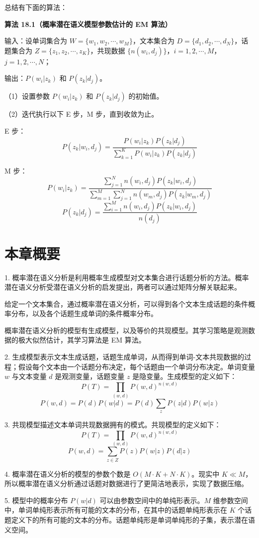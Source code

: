 \documentclass[UTF8, 12pt, fontset=fandol, oneside]{ctexart}
\begin{document}
总结有下面的算法：

\noindent\textbf{算法 18.1（概率潜在语义模型参数估计的 EM 算法）}

\noindent 输入：设单词集合为 $W=\{w_1,w_2,\cdots,w_M\}$，文本集合为 $D=\{d_1,d_2,\cdots,d_N\}$，话题集合为 $Z=\{z_1,z_2,\cdots,z_K\}$，共现数据 $\{n(w_i,d_j)\}$，$i=1,2,\cdots,M$，$j=1,2,\cdots,N$；

\noindent 输出：$P(w_i|z_k)$ 和 $P(z_k|d_j)$。

（1）设置参数 $P(w_i|z_k)$ 和 $P(z_k|d_j)$ 的初始值。

（2）迭代执行以下 E 步，M 步，直到收敛为止。

\noindent E 步：
\[
P(z_k|w_i,d_j)=
\frac{P(w_i|z_k)P(z_k|d_j)}
{\displaystyle\sum_{k=1}^{K}P(w_i|z_k)P(z_k|d_j)}
\]

\noindent M 步：
\[
P(w_i|z_k)=
\frac{\displaystyle\sum_{j=1}^{N}n(w_i,d_j)P(z_k|w_i,d_j)}
{\displaystyle\sum_{m=1}^{M}\sum_{j=1}^{N}n(w_m,d_j)P(z_k|w_m,d_j)}
\]
\[
P(z_k|d_j)=
\frac{\displaystyle\sum_{i=1}^{M}n(w_i,d_j)P(z_k|w_i,d_j)}
{n(d_j)}
\]

\section*{本章概要}

1. 概率潜在语义分析是利用概率生成模型对文本集合进行话题分析的方法。概率潜在语义分析受潜在语义分析的启发提出，两者可以通过矩阵分解关联起来。

给定一个文本集合，通过概率潜在语义分析，可以得到各个文本生成话题的条件概率分布，以及各个话题生成单词的条件概率分布。

概率潜在语义分析的模型有生成模型，以及等价的共现模型。其学习策略是观测数据的极大似然估计，其学习算法是 EM 算法。

2. 生成模型表示文本生成话题，话题生成单词，从而得到单词-文本共现数据的过程；假设每个文本由一个话题分布决定，每个话题由一个单词分布决定。单词变量 $w$ 与文本变量 $d$ 是观测变量，话题变量 $z$ 是隐变量。生成模型的定义如下：
\[
P(T)=\prod_{(w,d)}P(w,d)^{n(w,d)}
\]
\[
P(w,d)=P(d)P(w|d)=P(d)\sum_z P(z|d)P(w|z)
\]

3. 共现模型描述文本单词共现数据拥有的模式。共现模型的定义如下：
\[
P(T)=\prod_{(w,d)}P(w,d)^{n(w,d)}
\]
\[
P(w,d)=\sum_{z\in Z}P(z)P(w|z)P(d|z)
\]

4. 概率潜在语义分析的模型的参数个数是 $O(M\cdot K+N\cdot K)$。现实中 $K\ll M$，所以概率潜在语义分析通过话题对数据进行了更简洁地表示，实现了数据压缩。

5. 模型中的概率分布 $P(w|d)$ 可以由参数空间中的单纯形表示。$M$ 维参数空间中，单词单纯形表示所有可能的文本的分布，在其中的话题单纯形表示在 $K$ 个话题定义下的所有可能的文本的分布。话题单纯形是单词单纯形的子集，表示潜在语义空间。
\end{document}
